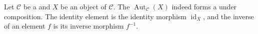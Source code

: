 \begin{proposition} \label{proposition:automorphism_group_of_an_object_of_a_locally_small_category_is_indeed_a_group}
    Let $\mathcal{C}$ be a  and $X$ be an object of $\mathcal{C}$.
    The  $\operatorname{Aut}_{\mathcal{C}}(X)$ indeed forms a  under composition. The identity element is the identity morphism $\operatorname{id}_X$, and the inverse of an element $f$ is its inverse morphism $f^{-1}$.
\end{proposition}